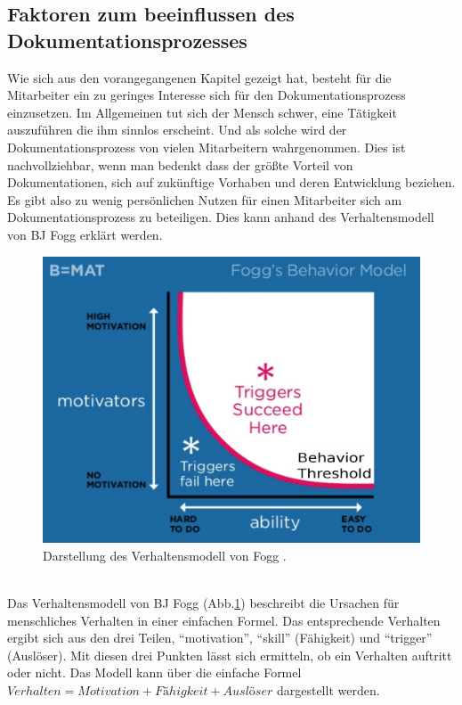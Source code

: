 \documentclass[a4paper,12pt,twoside]{scrartcl}
\begin{document}
\subsection{Faktoren zum beeinflussen des Dokumentationsprozesses}
\label{Dokunutzen}
Wie sich aus den vorangegangenen Kapitel gezeigt hat, besteht für die Mitarbeiter ein zu geringes Interesse sich für den Dokumentationsprozess einzusetzen. Im Allgemeinen tut sich der Mensch schwer, eine Tätigkeit auszuführen die ihm sinnlos erscheint. Und als solche wird der Dokumentationsprozess von vielen Mitarbeitern wahrgenommen. Dies ist nachvollziehbar, wenn man bedenkt dass der größte Vorteil von Dokumentationen, sich auf zukünftige Vorhaben und deren Entwicklung beziehen. Es gibt also zu wenig persönlichen Nutzen für einen Mitarbeiter sich am Dokumentationsprozess zu beteiligen. Dies kann anhand des Verhaltensmodell von BJ Fogg erklärt werden.
\\
\begin{figure}[h!]
\begin{center}
\includegraphics[scale = 0.4]{Bilder/Verhaltensmodell.eps}
\caption{Darstellung des Verhaltensmodell von Fogg \cite{Verhaltensmodell2018}.}
\label{VerhaltensmodellBild}
\end{center}
\end{figure}
\\
Das Verhaltensmodell von BJ Fogg (Abb.\ref{VerhaltensmodellBild}) beschreibt die Ursachen für menschliches Verhalten in einer einfachen Formel. Das entsprechende Verhalten ergibt sich aus den drei Teilen, \enquote{motivation}, \enquote{skill} (Fähigkeit) und \enquote{trigger} (Auslöser). Mit diesen drei Punkten lässt sich ermitteln, ob ein Verhalten auftritt oder nicht. Das Modell kann über die einfache Formel \( Verhalten = Motivation + Fähigkeit + Auslöser \) dargestellt werden.
\end{document}
